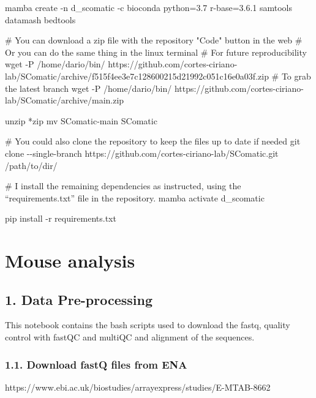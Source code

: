 \documentclass[
  letterpaper,
  DIV=11,
  numbers=noendperiod]{scrreprt}
\newenvironment{Shaded}{\begin{snugshade}}{\end{snugshade}}
\newcommand{\NormalTok}[1]{\textcolor[rgb]{0.00,0.23,0.31}{#1}}
\begin{document}
\begin{Shaded}
\begin{Highlighting}[]
\NormalTok{mamba create {-}n d\_scomatic {-}c bioconda python=3.7 r{-}base=3.6.1 samtools datamash bedtools}

\NormalTok{\# You can download a zip file with the repository "Code" button in the web}
\NormalTok{\# Or you can do the same thing in the linux terminal}
\NormalTok{\# For future reproducibility}
\NormalTok{wget {-}P /home/dario/bin/ https://github.com/cortes{-}ciriano{-}lab/SComatic/archive/f515f4ee3e7c128600215d21992c051c16e0a03f.zip}
\NormalTok{\# To grab the latest branch}
\NormalTok{wget {-}P /home/dario/bin/ https://github.com/cortes{-}ciriano{-}lab/SComatic/archive/main.zip}

\NormalTok{unzip *zip}
\NormalTok{mv SComatic{-}main SComatic}

\NormalTok{\# You could also clone the repository to keep the files up to date if needed}
\NormalTok{git clone {-}{-}single{-}branch https://github.com/cortes{-}ciriano{-}lab/SComatic.git /path/to/dir/}

\NormalTok{\# I install the remaining dependencies as instructed, using the “requirements.txt” file in the repository.}
\NormalTok{mamba activate d\_scomatic}

\NormalTok{pip install {-}r requirements.txt}
\end{Highlighting}
\end{Shaded}

\part{Mouse analysis}

\chapter{1. Data Pre-processing}\label{data-pre-processing}

This notebook contains the bash scripts used to download the fastq,
quality control with fastQC and multiQC and alignment of the sequences.

\section{1.1. Download fastQ files from
ENA}\label{download-fastq-files-from-ena}

https://www.ebi.ac.uk/biostudies/arrayexpress/studies/E-MTAB-8662
\end{document}
